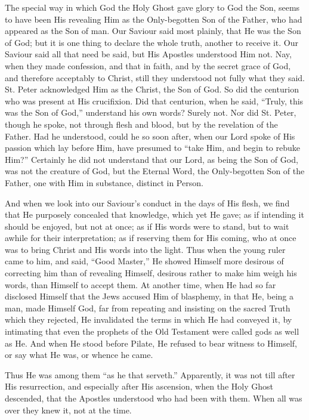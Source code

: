 The special way in which God the Holy Ghost gave glory to God the
Son, seems to have been His revealing Him as the Only-begotten Son of
the Father, who had appeared as the Son of man. Our Saviour said most
plainly, that He was the Son of God; but it is one thing to declare
the whole truth, another to receive it. Our Saviour said all that need
be said, but His Apostles understood Him not. Nay, when they made
confession, and that in faith, and by the secret grace of God, and
therefore acceptably to Christ, still they understood not fully what
they said. St. Peter acknowledged Him as the Christ, the Son of God.
So did the centurion who was present at His crucifixion. Did that
centurion, when he said, ``Truly, this was the Son of God,''
understand his own words? Surely not. Nor did St. Peter, though he
spoke, not through flesh and blood, but by the revelation of the
Father. Had he understood, could he so soon after, when our Lord spoke
of His passion which lay before Him, have presumed to ``take Him,
and begin to rebuke Him?'' Certainly he did not understand that
our Lord, as being the Son of God, was not the creature of God, but
the Eternal Word, the Only-begotten Son of the Father, one with Him in
substance, distinct in Person.

And when we look into our Saviour's conduct in the days of His
flesh, we find that He purposely concealed that knowledge, which yet
He gave; as if intending it should be enjoyed, but not at once; as if
His words were to stand, but to wait awhile for their interpretation;
as if reserving them for His coming, who at once was to bring Christ
and His words into the light. Thus when the young ruler came to him,
and said, ``Good Master,'' He showed Himself more desirous of
correcting him than of revealing Himself, desirous rather to make him
weigh his words, than Himself to accept them. At another time, when He
had so far disclosed Himself that the Jews accused Him of blasphemy,
in that He, being a man, made Himself God, far from repeating and
insisting on the sacred Truth which they rejected, He invalidated the
terms in which He had conveyed it, by intimating that even the
prophets of the Old Testament were called gods as well as He. And when
He stood before Pilate, He refused to bear witness to Himself, or say
what He was, or whence he came.

Thus He was among them ``as he that serveth.'' Apparently,
it was not till after His resurrection, and especially after His
ascension, when the Holy Ghost descended, that the Apostles understood
who had been with them. When all was over they knew it, not at the
time.


